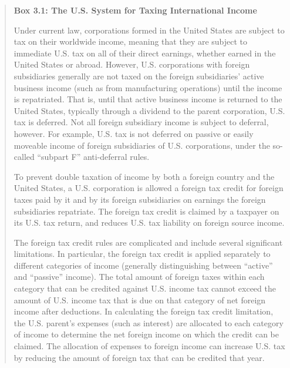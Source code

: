 \begin{select}
\begin{framed} 
\begin{quote}
\textbf{Box 3.1:  The U.S. System for Taxing International Income} 
 
Under current law, corporations formed in the United States are subject to tax on 
their worldwide income, meaning that they are subject to immediate U.S. tax on all of 
their direct earnings, whether earned in the United States or abroad.  However, U.S. 
corporations with foreign subsidiaries generally are not taxed on the foreign subsidiaries' 
active business income (such as from manufacturing operations) until the income is 
repatriated.  That is, until that active business income is returned to the United States, 
typically through a dividend to the parent corporation, U.S. tax is deferred.  Not all 
foreign subsidiary income is subject to deferral, however.  For example, U.S. tax is not 
deferred on passive or easily moveable income of foreign subsidiaries of U.S. 
corporations, under the so-called ``subpart F'' anti-deferral rules.  
  
To prevent double taxation of income by both a foreign country and the United 
States, a U.S. corporation is allowed a foreign tax credit for foreign taxes paid by it and 
by its foreign subsidiaries on earnings the foreign subsidiaries repatriate.  The foreign tax 
credit is claimed by a taxpayer on its U.S. tax return, and reduces U.S. tax liability on 
foreign source income.   
 
The foreign tax credit rules are complicated and include several significant 
limitations.  In particular, the foreign tax credit is applied separately to different 
categories of income (generally distinguishing between ``active'' and ``passive'' income).  
The total amount of foreign taxes within each category that can be credited against U.S. 
income tax cannot exceed the amount of U.S. income tax that is due on that category of 
net foreign income after deductions.  In calculating the foreign tax credit limitation, the 
U.S. parent's expenses (such as interest) are allocated to each category of income to 
determine the net foreign income on which the credit can be claimed.  The allocation of 
expenses to foreign income can increase U.S. tax by reducing the amount of foreign tax 
that can be credited that year.  
    

\end{quote}
\end{framed}
\end{select}
